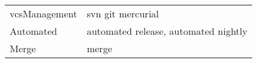 \begin{table}[]
\begin{tabular}{@{}m{}m{}@{}}
      vcsManagement  & svn git mercurial                                                                                               \\
      Automated      & automated release, automated nightly                                                                            \\
      Merge          & merge                                                                                                           \\ \bottomrule
   \end{tabular}
\end{table}